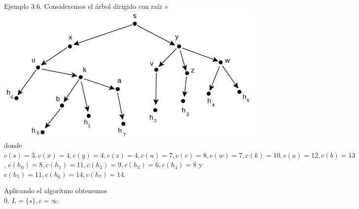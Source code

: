 \documentclass[10pt]{article}
\begin{document}
Ejemplo 3.6. Consideremos el árbol dirigido con raíz $s$\\
\includegraphics[max width=\textwidth, center]{2025_09_05_458e5b1ce89abceb5d44g-16}\\
donde $c(s)=3, c(x)=4, c(y)=4, c(z)=4, c(u)=7, c(v)=8, c(w)=7, c(k)=10, c(a)=12, c(b)=13$, $c\left(h_{0}\right)=8, c\left(h_{1}\right)=11, c\left(h_{2}\right)=9, c\left(h_{3}\right)=6, c\left(h_{4}\right)=8$ y $c\left(h_{5}\right)=11, c\left(h_{6}\right)=14, c\left(h_{7}\right)=14$.

Aplicando el algoritmo obtenemos\\
0. $L=\{s\}, c=\infty$.
\end{document}
